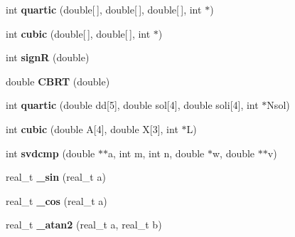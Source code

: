 \begin{DoxyCompactItemize}
\item 
int {\bfseries quartic} (double\mbox{[}$\,$\mbox{]}, double\mbox{[}$\,$\mbox{]}, double\mbox{[}$\,$\mbox{]}, int $\ast$)\hypertarget{namespacekukadu_a88bff7779cca8b5e068e4610d7bc5351}{}\label{namespacekukadu_a88bff7779cca8b5e068e4610d7bc5351}

\item 
int {\bfseries cubic} (double\mbox{[}$\,$\mbox{]}, double\mbox{[}$\,$\mbox{]}, int $\ast$)\hypertarget{namespacekukadu_a405a96da22f560512f812fbcbf331acd}{}\label{namespacekukadu_a405a96da22f560512f812fbcbf331acd}

\item 
int {\bfseries signR} (double)\hypertarget{namespacekukadu_ae79d3e1e8e3a6809c528902713ae056c}{}\label{namespacekukadu_ae79d3e1e8e3a6809c528902713ae056c}

\item 
double {\bfseries C\+B\+RT} (double)\hypertarget{namespacekukadu_a3cac074b46a52e681560a4b450f2b03e}{}\label{namespacekukadu_a3cac074b46a52e681560a4b450f2b03e}

\item 
int {\bfseries quartic} (double dd\mbox{[}5\mbox{]}, double sol\mbox{[}4\mbox{]}, double soli\mbox{[}4\mbox{]}, int $\ast$Nsol)\hypertarget{namespacekukadu_ad2373f3cf47719544900b6b28f050230}{}\label{namespacekukadu_ad2373f3cf47719544900b6b28f050230}

\item 
int {\bfseries cubic} (double A\mbox{[}4\mbox{]}, double X\mbox{[}3\mbox{]}, int $\ast$L)\hypertarget{namespacekukadu_a88d29e90b7e3369528198b2e7b91ea16}{}\label{namespacekukadu_a88d29e90b7e3369528198b2e7b91ea16}

\item 
int {\bfseries svdcmp} (double $\ast$$\ast$a, int m, int n, double $\ast$w, double $\ast$$\ast$v)\hypertarget{namespacekukadu_ac59bc95fa30b4cbf971a8ad11a09a3e2}{}\label{namespacekukadu_ac59bc95fa30b4cbf971a8ad11a09a3e2}

\item 
real\+\_\+t {\bfseries \+\_\+sin} (real\+\_\+t a)\hypertarget{namespacekukadu_a6bbde4d62354fd0c1749bd7930395eac}{}\label{namespacekukadu_a6bbde4d62354fd0c1749bd7930395eac}

\item 
real\+\_\+t {\bfseries \+\_\+cos} (real\+\_\+t a)\hypertarget{namespacekukadu_a83a8c88024bae8734c6419fed7045d12}{}\label{namespacekukadu_a83a8c88024bae8734c6419fed7045d12}

\item 
real\+\_\+t {\bfseries \+\_\+atan2} (real\+\_\+t a, real\+\_\+t b)\hypertarget{namespacekukadu_a09106be5cf9a56cbbb21c2cf6e4ff2a9}{}\label{namespacekukadu_a09106be5cf9a56cbbb21c2cf6e4ff2a9}


\end{DoxyCompactItemize}
